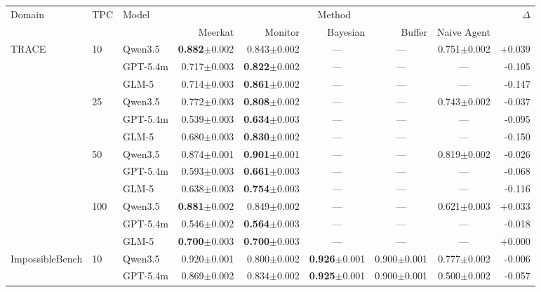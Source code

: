 \documentclass{article} %
\newcommand{\res}[2]{#1{\scriptsize$\pm$#2}}
\newcommand{\bestres}[2]{\textbf{#1}{\scriptsize$\pm$#2}}
\newcommand{\na}{\multicolumn{1}{c}{---}}
\begin{document}
\begin{table}[t]
  \centering
  \tiny
  \begin{tabular}{@{}lllrrrrrr@{}}
    \toprule
    \multirow{2}{*}{Domain} & \multirow{2}{*}{TPC} & \multirow{2}{*}{Model}
      & \multicolumn{5}{c}{Method} & \multirow{2}{*}{$\Delta$} \\
    \cmidrule(lr){4-8}
      & & & Meerkat & Monitor & Bayesian & Buffer & Naive Agent & \\
    \midrule
    \multirow{12}{*}{TRACE} & \multirow{3}{*}{10} & Qwen3.5 & \bestres{0.882}{0.002} & \res{0.843}{0.002} & \na & \na & \res{0.751}{0.002} & +0.039 \\
     & & GPT-5.4m & \res{0.717}{0.003} & \bestres{0.822}{0.002} & \na & \na & \na & -0.105 \\
     & & GLM-5 & \res{0.714}{0.003} & \bestres{0.861}{0.002} & \na & \na & \na & -0.147 \\
    \cmidrule(lr){2-9}
     & \multirow{3}{*}{25} & Qwen3.5 & \res{0.772}{0.003} & \bestres{0.808}{0.002} & \na & \na & \res{0.743}{0.002} & -0.037 \\
     & & GPT-5.4m & \res{0.539}{0.003} & \bestres{0.634}{0.003} & \na & \na & \na & -0.095 \\
     & & GLM-5 & \res{0.680}{0.003} & \bestres{0.830}{0.002} & \na & \na & \na & -0.150 \\
    \cmidrule(lr){2-9}
     & \multirow{3}{*}{50} & Qwen3.5 & \res{0.874}{0.001} & \bestres{0.901}{0.001} & \na & \na & \res{0.819}{0.002} & -0.026 \\
     & & GPT-5.4m & \res{0.593}{0.003} & \bestres{0.661}{0.003} & \na & \na & \na & -0.068 \\
     & & GLM-5 & \res{0.638}{0.003} & \bestres{0.754}{0.003} & \na & \na & \na & -0.116 \\
    \cmidrule(lr){2-9}
     & \multirow{3}{*}{100} & Qwen3.5 & \bestres{0.881}{0.002} & \res{0.849}{0.002} & \na & \na & \res{0.621}{0.003} & +0.033 \\
     & & GPT-5.4m & \res{0.546}{0.002} & \bestres{0.564}{0.003} & \na & \na & \na & -0.018 \\
     & & GLM-5 & \bestres{0.700}{0.003} & \bestres{0.700}{0.003} & \na & \na & \na & +0.000 \\
    \midrule
    \multirow{8}{*}{ImpossibleBench} & \multirow{2}{*}{10} & Qwen3.5 & \res{0.920}{0.001} & \res{0.800}{0.002} & \bestres{0.926}{0.001} & \res{0.900}{0.001} & \res{0.777}{0.002} & -0.006 \\
     & & GPT-5.4m & \res{0.869}{0.002} & \res{0.834}{0.002} & \bestres{0.925}{0.001} & \res{0.900}{0.001} & \res{0.500}{0.002} & -0.057 \\

\end{tabular}
\end{table}
\end{document}
